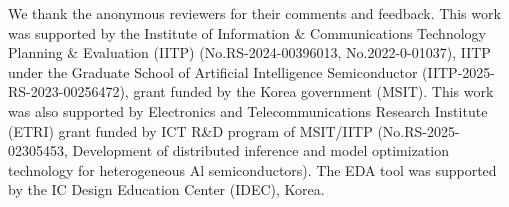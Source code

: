 \begin{acks}

  We thank the anonymous reviewers for their comments and feedback.
  This work was supported by the Institute of Information \&
  Communications Technology Planning \& Evaluation (IITP)
  (No.RS-2024-00396013, No.2022-0-01037), IITP under the Graduate School of
  Artificial Intelligence Semiconductor (IITP-2025-RS-2023-00256472),
  grant funded by the Korea government (MSIT).
  This work was also supported by Electronics and Telecommunications
  Research Institute (ETRI) grant funded by ICT R\&D program of
  MSIT/IITP (No.RS-2025-02305453, Development of distributed
    inference and model optimization technology for heterogeneous Al
  semiconductors).
  The EDA tool was supported by the IC Design Education Center (IDEC), Korea.
\end{acks}
